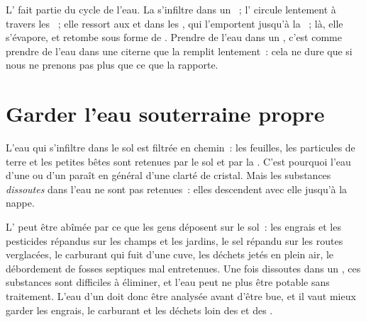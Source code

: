 L' fait partie du cycle de l'eau. La  s'infiltre dans
un ~; l' circule lentement à travers les ~;
elle ressort aux  et dans les , qui l'emportent jusqu'à la
~; là, elle s'évapore, et retombe sous forme de . Prendre de l'eau
dans un , c'est comme prendre de l'eau dans une citerne que la
 remplit lentement~: cela ne dure que si nous ne prenons pas plus que
ce que la  rapporte.

\section{Garder l'eau souterraine propre}

L'eau qui s'infiltre dans le sol est filtrée en chemin~: les feuilles, les
particules de terre et les petites bêtes sont retenues par le sol et par la
. C'est pourquoi l'eau d'une  ou d'un  paraît en général
d'une clarté de cristal. Mais les substances \emph{dissoutes} dans l'eau ne
sont pas retenues~: elles descendent avec elle jusqu'à la nappe.

L' peut être abîmée par ce que les gens déposent sur le
sol~: les engrais et les pesticides répandus sur les champs et les jardins,
le sel répandu sur les routes verglacées, le carburant qui fuit d'une
cuve, les déchets jetés en plein air, le débordement de fosses septiques
mal entretenues. Une fois dissoutes dans un , ces substances sont
difficiles à éliminer, et l'eau peut ne plus être potable sans traitement.
L'eau d'un  doit donc être analysée avant d'être bue, et il vaut mieux
garder les engrais, le carburant et les déchets loin des  et des
.

